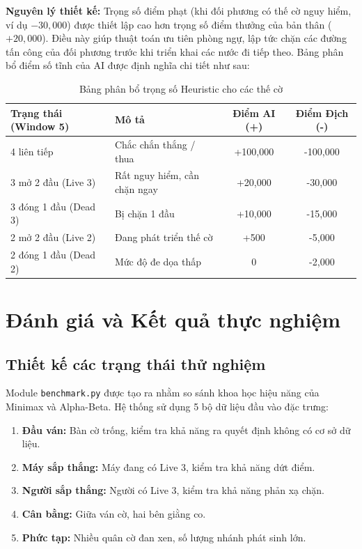 \documentclass[13pt,a4paper]{article}
\begin{document}
\textbf{Nguyên lý thiết kế:} Trọng số điểm phạt (khi đối phương có thế cờ nguy hiểm, ví dụ $-30,000$) được thiết lập cao hơn trọng số điểm thưởng của bản thân ($+20,000$). Điều này giúp thuật toán ưu tiên phòng ngự, lập tức chặn các đường tấn công của đối phương trước khi triển khai các nước đi tiếp theo. Bảng phân bổ điểm số tĩnh của AI được định nghĩa chi tiết như sau:

\begin{table}[!htbp]
\centering
\begin{tabular}{llcc}
\toprule
\textbf{Trạng thái (Window 5)} & \textbf{Mô tả} & \textbf{Điểm AI (+)} & \textbf{Điểm Địch (-)} \\ \midrule
4 liên tiếp & Chắc chắn thắng / thua & +100,000 & -100,000 \\
3 mở 2 đầu (Live 3) & Rất nguy hiểm, cần chặn ngay & +20,000 & -30,000 \\
3 đóng 1 đầu (Dead 3) & Bị chặn 1 đầu & +10,000 & -15,000 \\
2 mở 2 đầu (Live 2) & Đang phát triển thế cờ & +500 & -5,000 \\
2 đóng 1 đầu (Dead 2) & Mức độ đe dọa thấp & 0 & -2,000 \\ \bottomrule
\end{tabular}
\caption{Bảng phân bổ trọng số Heuristic cho các thế cờ}
\end{table}

\section{Đánh giá và Kết quả thực nghiệm}

\subsection{Thiết kế các trạng thái thử nghiệm}
Module \texttt{benchmark.py} được tạo ra nhằm so sánh khoa học hiệu năng của Minimax và Alpha-Beta. Hệ thống sử dụng 5 bộ dữ liệu đầu vào đặc trưng:
\begin{enumerate}
    \item \textbf{Đầu ván:} Bàn cờ trống, kiểm tra khả năng ra quyết định không có cơ sở dữ liệu.
    \item \textbf{Máy sắp thắng:} Máy đang có Live 3, kiểm tra khả năng dứt điểm.
    \item \textbf{Người sắp thắng:} Người có Live 3, kiểm tra khả năng phản xạ chặn.
    \item \textbf{Cân bằng:} Giữa ván cờ, hai bên giằng co.
    \item \textbf{Phức tạp:} Nhiều quân cờ đan xen, số lượng nhánh phát sinh lớn.
\end{enumerate}
\end{document}
